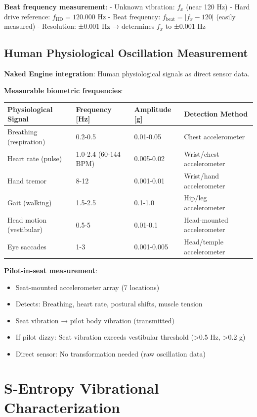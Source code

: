 \documentclass[12pt,a4paper]{article}
\begin{document}
\textbf{Beat frequency measurement}:
- Unknown vibration: $f_x$ (near 120 Hz)
- Hard drive reference: $f_{\text{HD}} = 120.000$ Hz
- Beat frequency: $f_{\text{beat}} = |f_x - 120|$ (easily measured)
- Resolution: ±0.001 Hz → determines $f_x$ to ±0.001 Hz

\subsection{Human Physiological Oscillation Measurement}

\textbf{Naked Engine integration}: Human physiological signals as direct sensor data.

\textbf{Measurable biometric frequencies}:

\begin{center}
\begin{tabular}{|l|l|l|l|}
\hline
\textbf{Physiological Signal} & \textbf{Frequency [Hz]} & \textbf{Amplitude [g]} & \textbf{Detection Method} \\
\hline
Breathing (respiration) & 0.2-0.5 & 0.01-0.05 & Chest accelerometer \\
Heart rate (pulse) & 1.0-2.4 (60-144 BPM) & 0.005-0.02 & Wrist/chest accelerometer \\
Hand tremor & 8-12 & 0.001-0.01 & Wrist/hand accelerometer \\
Gait (walking) & 1.5-2.5 & 0.1-1.0 & Hip/leg accelerometer \\
Head motion (vestibular) & 0.5-5 & 0.01-0.1 & Head-mounted accelerometer \\
Eye saccades & 1-3 & 0.001-0.005 & Head/temple accelerometer \\
\hline
\end{tabular}
\end{center}

\textbf{Pilot-in-seat measurement}:
\begin{itemize}
\item Seat-mounted accelerometer array (7 locations)
\item Detects: Breathing, heart rate, postural shifts, muscle tension
\item Seat vibration → pilot body vibration (transmitted)
\item If pilot dizzy: Seat vibration exceeds vestibular threshold (>0.5 Hz, >0.2 g)
\item Direct sensor: No transformation needed (raw oscillation data)
\end{itemize}

\section{S-Entropy Vibrational Characterization}
\end{document}
